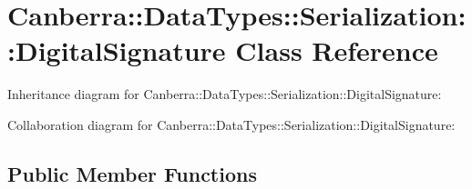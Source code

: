 \hypertarget{class_canberra_1_1_data_types_1_1_serialization_1_1_digital_signature}{}\section{Canberra\+:\+:Data\+Types\+:\+:Serialization\+:\+:Digital\+Signature Class Reference}
\label{class_canberra_1_1_data_types_1_1_serialization_1_1_digital_signature}


Inheritance diagram for Canberra\+:\+:Data\+Types\+:\+:Serialization\+:\+:Digital\+Signature\+:


Collaboration diagram for Canberra\+:\+:Data\+Types\+:\+:Serialization\+:\+:Digital\+Signature\+:
\subsection*{Public Member Functions}
